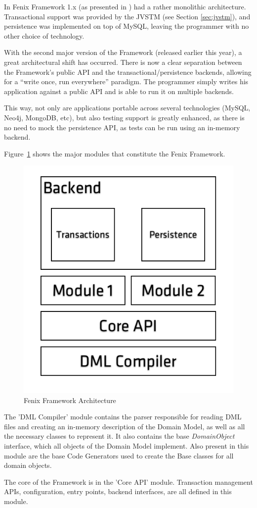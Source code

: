 In Fenix Framework 1.x (as presented in \cite{fernandes2011strict})
had a rather monolithic architecture. Transactional support was
provided by the JVSTM (see Section \ref{sec:jvstm}), and persistence
was implemented on top of MySQL, leaving the programmer with no other
choice of technology.

With the second major version of the Framework (released earlier this
year), a great architectural shift has occurred. There is now a clear
separation between the Framework's public API and the
transactional/persistence backends, allowing for a ``write once, run
everywhere'' paradigm. The programmer simply writes his application
against a public API and is able to run it on multiple backends.

This way, not only are applications portable across several
technologies (MySQL, Neo4j, MongoDB, etc), but also testing support is
greatly enhanced, as there is no need to mock the persistence API, as
tests can be run using an in-memory backend.

Figure~\ref{fig:ff-arch} shows the major modules that constitute the Fenix
Framework.

\begin{figure}
\centering
\includegraphics[width=0.5\linewidth]{ff-arch}
\caption{Fenix Framework Architecture}
\label{fig:ff-arch}
\end{figure}

The 'DML Compiler' module contains the parser responsible for reading
DML files and creating an in-memory description of the Domain Model,
as well as all the necessary classes to represent it. It also contains
the base {\it DomainObject} interface, which all objects of the Domain
Model implement. Also present in this module are the base Code
Generators used to create the Base classes for all domain
objects.

The core of the Framework is in the 'Core API' module. Transaction
management APIs, configuration, entry points, backend interfaces, are
all defined in this module.

